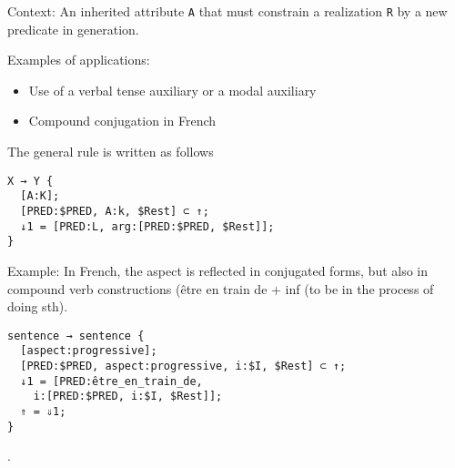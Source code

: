 \documentclass[11pt]{article}
\begin{document}
Context:
An inherited attribute \texttt{A} that must constrain a realization
\texttt{R} by a new predicate in generation.

Examples of applications:
\begin{itemize}
\item Use of a verbal tense auxiliary or a modal auxiliary
\item Compound conjugation in French
\end{itemize}

The general rule is written as follows

\begin{lstlisting}
X → Y {
  [A:K];
  [PRED:$PRED, A:k, $Rest] ⊂ ↑;
  ↓1 = [PRED:L, arg:[PRED:$PRED, $Rest]];
}

\end{lstlisting}

Example:
In French, the aspect is reflected in conjugated forms, but also in
compound verb constructions (\og être en train de + inf\fg{} (to be in the
process of doing sth). 

\begin{lstlisting}
sentence → sentence {
  [aspect:progressive];
  [PRED:$PRED, aspect:progressive, i:$I, $Rest] ⊂ ↑;
  ↓1 = [PRED:être_en_train_de, 
	i:[PRED:$PRED, i:$I, $Rest]];
  ⇑ = ⇓1;
}
\end{lstlisting}

.
\end{document}
